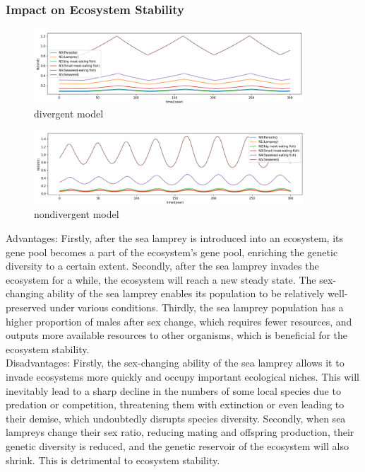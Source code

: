 \documentclass[12pt]{article}
\begin{document}
\subsubsection{Impact on Ecosystem Stability}
\begin{figure}[h]
	\centering
	\includegraphics[width=0.9\textwidth]{Q3_divergent.png}
	\caption{divergent model}
\end{figure}
\begin{figure}[h]
	\centering
	\includegraphics[width=0.9\textwidth]{Q3_nondivergence.png}
	\caption{nondivergent model}
\end{figure}
Advantages: Firstly, after the sea lamprey is introduced into an ecosystem, its gene pool becomes 
a part of the ecosystem's gene pool, enriching the genetic diversity to a certain extent. 
Secondly, after the sea lamprey invades the ecosystem for a while, the ecosystem will reach 
a new steady state. The sex-changing ability of the sea lamprey enables its population to 
be relatively well-preserved under various conditions. Thirdly, the sea lamprey population 
has a higher proportion of males after sex change, which requires fewer resources, and 
outputs more available resources to other organisms, which is beneficial for the ecosystem stability.\\
Disadvantages: Firstly, the sex-changing ability of the sea lamprey allows it to invade ecosystems 
more quickly and occupy important ecological niches. This will inevitably lead to a sharp decline 
in the numbers of some local species due to predation or competition, threatening them with 
extinction or even leading to their demise, which undoubtedly disrupts species diversity. 
Secondly, when sea lampreys change their sex ratio, reducing mating and offspring production, 
their genetic diversity is reduced, and the genetic reservoir of the ecosystem will also shrink. 
This is detrimental to ecosystem stability. 
\end{document}
